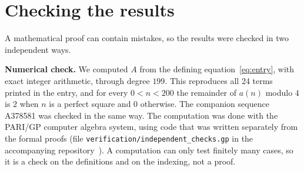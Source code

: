 \documentclass[11pt,a4paper]{article}
\theoremstyle{definition}
\theoremstyle{remark}
\newcommand{\para}[1]{\par\medskip\noindent\textbf{#1}\enspace}
\begin{document}
\section{Checking the results}\label{sec:checks}

A mathematical proof can contain mistakes, so the results were checked in two independent ways.

\para{Numerical check.}
We computed $A$ from the defining equation~\eqref{eq:entry}, with exact integer arithmetic, through degree
$199$. This reproduces all 24 terms printed in the entry, and for every $0<n<200$ the remainder of
$a(n)$ modulo $4$ is $2$ when $n$ is a perfect square and $0$ otherwise. The companion sequence A378581 was
checked in the same way.
The computation was done with the PARI/GP computer algebra system, using code that was written separately from the
formal proofs (file \texttt{verification/independent\_checks.gp} in the accompanying repository~\cite{repo}).
A computation can only test finitely many cases, so it is a check on the definitions and on the indexing, not a proof.
\end{document}
